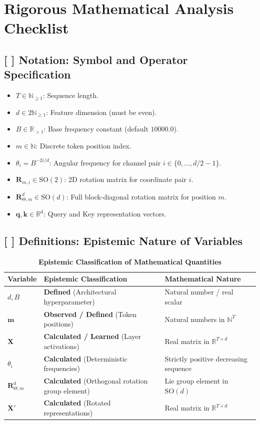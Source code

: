 \documentclass[11pt,a4paper]{article}
\theoremstyle{definition}
\begin{document}
\section{Rigorous Mathematical Analysis Checklist}

\subsection{[ ] Notation: Symbol and Operator Specification}
\begin{itemize}
    \item $T \in \mathbb{N}_{\ge 1}$: Sequence length.
    \item $d \in 2\mathbb{N}_{\ge 1}$: Feature dimension (must be even).
    \item $B \in \mathbb{R}_{> 1}$: Base frequency constant (default $10000.0$).
    \item $m \in \mathbb{N}$: Discrete token position index.
    \item $\theta_i = B^{-2i/d}$: Angular frequency for channel pair $i \in \{0, \dots, d/2 - 1\}$.
    \item $\mathbf{R}_{m, i} \in \mathrm{SO}(2)$: 2D rotation matrix for coordinate pair $i$.
    \item $\mathbf{R}_{\Theta, m}^d \in \mathrm{SO}(d)$: Full block-diagonal rotation matrix for position $m$.
    \item $\mathbf{q}, \mathbf{k} \in \mathbb{R}^d$: Query and Key representation vectors.
\end{itemize}

\subsection{[ ] Definitions: Epistemic Nature of Variables}
\begin{table}[h]
\centering
\caption{\textbf{Epistemic Classification of Mathematical Quantities}}
\begin{tabular}{lll}
\toprule
\textbf{Variable} & \textbf{Epistemic Classification} & \textbf{Mathematical Nature} \\
\midrule
$d, B$ & \textbf{Defined} (Architectural hyperparameter) & Natural number / real scalar \\
$\mathbf{m}$ & \textbf{Observed / Defined} (Token positions) & Natural numbers in $\mathbb{N}^T$ \\
$\mathbf{X}$ & \textbf{Calculated / Learned} (Layer activations) & Real matrix in $\mathbb{R}^{T \times d}$ \\
$\theta_i$ & \textbf{Calculated} (Deterministic frequencies) & Strictly positive decreasing sequence \\
$\mathbf{R}_{\Theta, m}^d$ & \textbf{Calculated} (Orthogonal rotation group element) & Lie group element in $\mathrm{SO}(d)$ \\
$\mathbf{X}'$ & \textbf{Calculated} (Rotated representations) & Real matrix in $\mathbb{R}^{T \times d}$ \\
\bottomrule
\end{tabular}
\end{table}
\end{document}
